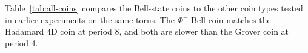 Table~\ref{tab:all-coins} compares the Bell-state coins to the other
coin types tested in earlier experiments on the same torus. The
$\Phi^-$ Bell coin matches the Hadamard 4D coin at period 8, and both
are slower than the Grover coin at period 4.
